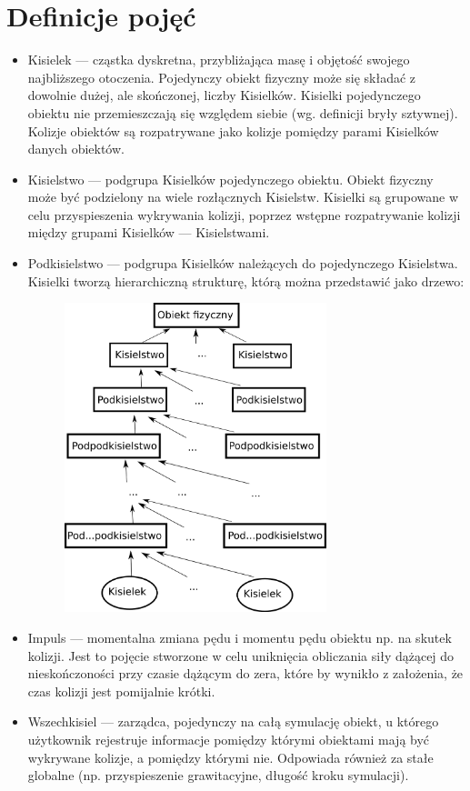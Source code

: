 \section{Definicje pojęć}
\begin{itemize}
  \item Kisielek --- cząstka dyskretna, przybliżająca masę i objętość swojego
	najbliższego otoczenia. Pojedynczy obiekt fizyczny może się składać z dowolnie
	dużej, ale skończonej, liczby Kisielków. Kisielki pojedynczego obiektu nie
	przemieszczają się względem siebie (wg. definicji bryły sztywnej). Kolizje
	obiektów są rozpatrywane jako kolizje pomiędzy parami Kisielków danych
	obiektów.
	\item Kisielstwo --- podgrupa Kisielków pojedynczego obiektu. Obiekt fizyczny
	może być podzielony na wiele rozłącznych Kisielstw. Kisielki są grupowane w
	celu przyspieszenia wykrywania kolizji, poprzez wstępne rozpatrywanie kolizji między
	grupami Kisielków --- Kisielstwami.
	\item Podkisielstwo --- podgrupa Kisielków należących do pojedynczego
	Kisielstwa. Kisielki tworzą hierarchiczną strukturę, którą można
	przedstawić jako drzewo:
	\begin{figure}[!h]
		\centering
		\includegraphics[height=90mm]{images/Hierarchia.png}
	\end{figure}
	\item Impuls --- momentalna zmiana pędu i momentu pędu obiektu np. na skutek
	kolizji. Jest to pojęcie stworzone w celu uniknięcia obliczania siły dążącej do
	nieskończoności przy czasie dążącym do zera, które by wynikło z założenia, że
	czas kolizji jest pomijalnie krótki.
	\item Wszechkisiel --- zarządca, pojedynczy na całą symulację obiekt, u którego
	użytkownik rejestruje informacje pomiędzy którymi obiektami mają być wykrywane
	kolizje, a pomiędzy którymi nie. Odpowiada również za stałe globalne (np.
	przyspieszenie grawitacyjne, długość kroku symulacji).
\end{itemize}

